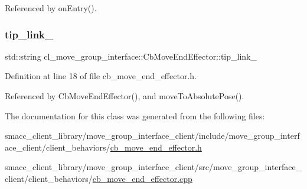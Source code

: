 Referenced by on\+Entry().

\mbox{\label{classcl__move__group__interface_1_1CbMoveEndEffector_a4b6f4468b2db565a07119ac90c067436}} 
\subsubsection{\texorpdfstring{tip\+\_\+link\+\_\+}{tip\_link\_}}
{\footnotesize\ttfamily std\+::string cl\+\_\+move\+\_\+group\+\_\+interface\+::\+Cb\+Move\+End\+Effector\+::tip\+\_\+link\+\_\+}



Definition at line 18 of file cb\+\_\+move\+\_\+end\+\_\+effector.\+h.



Referenced by Cb\+Move\+End\+Effector(), and move\+To\+Absolute\+Pose().



The documentation for this class was generated from the following files\+:\begin{DoxyCompactItemize}
\item 
smacc\+\_\+client\+\_\+library/move\+\_\+group\+\_\+interface\+\_\+client/include/move\+\_\+group\+\_\+interface\+\_\+client/client\+\_\+behaviors/\hyperlink{cb__move__end__effector_8h}{cb\+\_\+move\+\_\+end\+\_\+effector.\+h}\item 
smacc\+\_\+client\+\_\+library/move\+\_\+group\+\_\+interface\+\_\+client/src/move\+\_\+group\+\_\+interface\+\_\+client/client\+\_\+behaviors/\hyperlink{cb__move__end__effector_8cpp}{cb\+\_\+move\+\_\+end\+\_\+effector.\+cpp}\end{DoxyCompactItemize}
